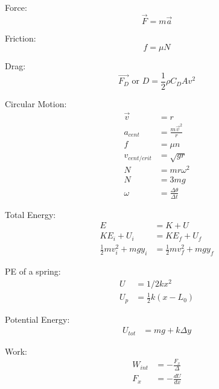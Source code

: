 \documentclass[10pt, letterpaper]{book}
\begin{document}
\begin{multicols*}{2}
        Force:
        \begin{equation}
            \vec{F} = m\vec{a}
        \end{equation}

        Friction:
        \begin{equation}
            f = \mu N
        \end{equation}

        Drag: 
        \begin{equation}
            \vec{F_D}\text{ or }D = \frac{1}{2}\rho C_{D}Av^{2}
        \end{equation}

        Circular Motion:
        \begin{align}
            \vec{v}         & = r                               \\
            a_{cent}        & =\frac{m\vec{v}^{2}}{r}           \\
            f               & = \mu n                           \\
            v_{cent/crit}   & = \sqrt{gr}                       \\
            N               & = mr\omega^{2}                    \\
            N               & = 3mg                             \\
            \omega          & = \frac{\Delta \theta}{\Delta t}  
        \end{align}

        Total Energy:
        \begin{align}
            E   & = K + U   \\
            KE_{i} + U_{i}  & = KE_{f} + U_{f}  \\
            \frac{1}{2}mv^{2}_{i} + mgy_{i} & = \frac{1}{2}mv^{2}_{f} + mgy_{f}
        \end{align}

        PE of a spring:
        \begin{align}
            U     & = 1/2kx^{2}                 \\
            U_{p} & = \frac{1}{2}k(x-L_{0})
        \end{align}

        Potential Energy:
        \begin{align}
            U_{tot} & = mg + k\Delta y 
        \end{align}

        Work:
        \begin{align}
            W_{int} & = -\frac{F_{x}}{\Delta }   \\
            F_{x}   & = -\frac{dU}{dx}
        \end{align} 


\end{multicols*}
\end{document}
